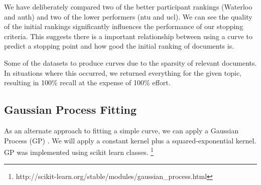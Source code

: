 \begin{table}[H]
\caption{Evaluation of curve fitting for different CLEF 2017 runs. lower = lower-bound confidence interval. Sample size = 3. Results are taken as averages over all topics for search method. with 0.5\% cut-off}

\end{table}

We have deliberately compared two of the better participant rankings (Waterloo and auth) and two of the lower performers (ntu and ucl). We can see the quality of the initial rankings significantly influences the performance of our stopping criteria. This suggests there is a important relationship between using a curve to predict a stopping point and how good the initial ranking of documents is. 

Some of the datasets to produce curves due to the sparsity of relevant documents. In situations where this occurred, we returned everything for the given topic, resulting in 100\% recall at the expense of 100\% effort.

\iffalse
\subsection{Gaussian Process Fitting}

As an alternate approach to fitting a simple curve, we can apply a Gaussian Process (GP) \cite{ebden2008gaussian}. We will apply a constant kernel plus a squared-exponential kernel. GP was implemented using scikit learn classes. \footnote{http://scikit-learn.org/stable/modules/gaussian\_process.html}


